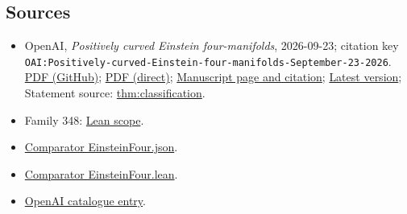 \documentclass[11pt]{article}
\begin{document}
\subsection{Sources}
\begin{itemize}
\item OpenAI, \emph{Positively curved Einstein four-manifolds}, 2026-09-23; citation key \texttt{OAI:Positively-curved-Einstein-four-manifolds-September-23-2026}. \href{https://github.com/openai/math/blob/adc7f1241b42e322a6451854ab7e4b4c146bf78a/preprints/Positively-curved-Einstein-four-manifolds-September-23-2026/paper.pdf}{PDF (GitHub)}; \href{https://github.com/openai/math/raw/adc7f1241b42e322a6451854ab7e4b4c146bf78a/preprints/Positively-curved-Einstein-four-manifolds-September-23-2026/paper.pdf}{PDF (direct)}; \href{https://github.com/openai/math/blob/adc7f1241b42e322a6451854ab7e4b4c146bf78a/preprints/Positively-curved-Einstein-four-manifolds-September-23-2026/README.md}{Manuscript page and citation}; \href{https://github.com/openai/math/blob/main/preprints/Positively-curved-Einstein-four-manifolds-September-23-2026/paper.pdf}{Latest version}; Statement source: \href{https://github.com/openai/math/blob/adc7f1241b42e322a6451854ab7e4b4c146bf78a/preprints/Positively-curved-Einstein-four-manifolds-September-23-2026/build/sections/01-introduction.tex\#L13}{thm:classification}.
\item Family 348: \href{https://github.com/openai/math/blob/adc7f1241b42e322a6451854ab7e4b4c146bf78a/lean/docs/348.md}{Lean scope}.
\item \href{https://github.com/openai/math/blob/adc7f1241b42e322a6451854ab7e4b4c146bf78a/lean/ComparatorChallenges/EinsteinFour.json}{Comparator EinsteinFour.json}.
\item \href{https://github.com/openai/math/blob/adc7f1241b42e322a6451854ab7e4b4c146bf78a/lean/ComparatorChallenges/EinsteinFour.lean}{Comparator EinsteinFour.lean}.
\item \href{https://github.com/openai/math/blob/adc7f1241b42e322a6451854ab7e4b4c146bf78a/CONTENTS.md}{OpenAI catalogue entry}.
\end{itemize}
\end{document}
